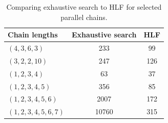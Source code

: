 \begin{table}[ht]
  \centering
  \quad
  \caption{Parallel chains: Comparison of the number of snapshots needed by exhaustive search in contrast to HLF. Each table denotes the number of chains ($N$) to the right, and the length of each chain ($L$) downwards.}
  \label{tab:parallel-chains-comparison-leaf-hlf}
\end{table}

\begin{table}[ht]
  \centering
  \begin{tabular}[ht]{lcc}
    Chain lengths & Exhaustive search & HLF \\
    \hline
    $(4,3,6,3)$ & 233 & 99 \\
    $(3,2,2,10)$ & 247 & 126 \\
    $(1,2,3,4)$ & 63 & 37 \\
    $(1,2,3,4,5)$ & 356 & 85 \\
    $(1,2,3,4,5,6)$ & 2007 & 172 \\
    $(1,2,3,4,5,6,7)$ & 10760 & 315
  \end{tabular}
  \caption{Comparing exhaustive search to HLF for selected parallel chains.}
  \label{tab:selected-parallel-chains-comparison}
\end{table}


